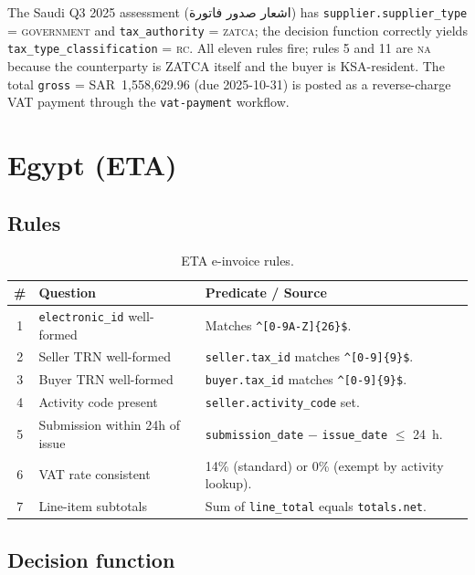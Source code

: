 \documentclass[11pt,a4paper,twoside]{report}
\newcommand{\ar}[1]{#1}
\begin{document}
The Saudi Q3 2025 assessment (\ar{اشعار صدور فاتورة}) has
\texttt{supplier.supplier\_type} = \textsc{government} and
\texttt{tax\_authority} = \textsc{zatca}; the decision function
correctly yields \texttt{tax\_type\_classification} = \textsc{rc}. All
eleven rules fire; rules 5 and 11 are \textsc{na} because the
counterparty is ZATCA itself and the buyer is KSA-resident. The total
\texttt{gross} = SAR~1{,}558{,}629.96 (due 2025-10-31) is posted as a
reverse-charge VAT payment through the \texttt{vat-payment} workflow.

\section{Egypt (ETA)}

\subsection{Rules}

\begin{table}[htbp]
\centering
\caption{ETA e-invoice rules.}
\label{tab:eta-rules}
\footnotesize
\begin{tabularx}{\linewidth}{@{}c l X@{}}
\toprule
\textbf{\#} & \textbf{Question} & \textbf{Predicate / Source} \\ \midrule
1 & \texttt{electronic\_id} well-formed
  & Matches \verb|^[0-9A-Z]{26}$|. \\
2 & Seller TRN well-formed   & \texttt{seller.tax\_id} matches \verb|^[0-9]{9}$|. \\
3 & Buyer TRN well-formed    & \texttt{buyer.tax\_id} matches \verb|^[0-9]{9}$|. \\
4 & Activity code present    & \texttt{seller.activity\_code} set. \\
5 & Submission within 24h of issue
  & \texttt{submission\_date} $-$ \texttt{issue\_date} $\leq$ 24~h. \\
6 & VAT rate consistent      & 14\% (standard) or 0\% (exempt by activity lookup). \\
7 & Line-item subtotals      & Sum of \texttt{line\_total} equals \texttt{totals.net}. \\
\bottomrule
\end{tabularx}
\end{table}

\subsection{Decision function}
\end{document}
